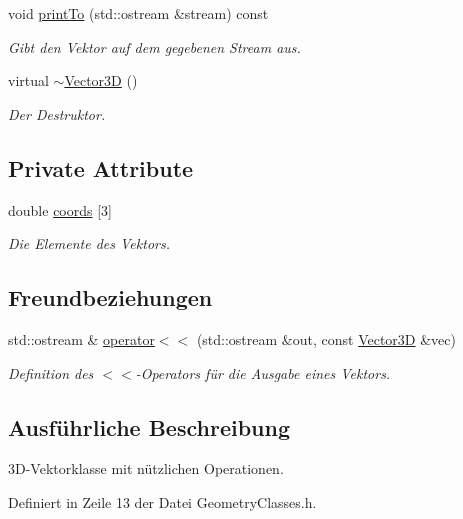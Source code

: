 \begin{DoxyCompactItemize}
void \hyperlink{classVector3D_a93ebaebe8d2f4f15ef1f79f5fe2cb682}{print\-To} (std\-::ostream \&stream) const 
\begin{DoxyCompactList}\small\item\em Gibt den Vektor auf dem gegebenen Stream aus. \end{DoxyCompactList}\item 
virtual \hyperlink{classVector3D_ae4fde5759270bf5bcf615f12f0823a8c}{$\sim$\-Vector3\-D} ()
\begin{DoxyCompactList}\small\item\em Der Destruktor. \end{DoxyCompactList}\end{DoxyCompactItemize}
\subsection*{Private Attribute}
\begin{DoxyCompactItemize}
\item 
double \hyperlink{classVector3D_a1049b9da244f538b5c1f3ac700a776ee}{coords} \mbox{[}3\mbox{]}
\begin{DoxyCompactList}\small\item\em Die Elemente des Vektors. \end{DoxyCompactList}\end{DoxyCompactItemize}
\subsection*{Freundbeziehungen}
\begin{DoxyCompactItemize}
\item 
std\-::ostream \& \hyperlink{classVector3D_a948421d7d2b275c202125839e5d7b843}{operator$<$$<$} (std\-::ostream \&out, const \hyperlink{classVector3D}{Vector3\-D} \&vec)
\begin{DoxyCompactList}\small\item\em Definition des $<$$<$-\/\-Operators für die Ausgabe eines Vektors. \end{DoxyCompactList}\end{DoxyCompactItemize}


\subsection{Ausführliche Beschreibung}
3\-D-\/\-Vektorklasse mit nützlichen Operationen. 

Definiert in Zeile 13 der Datei Geometry\-Classes.\-h.



